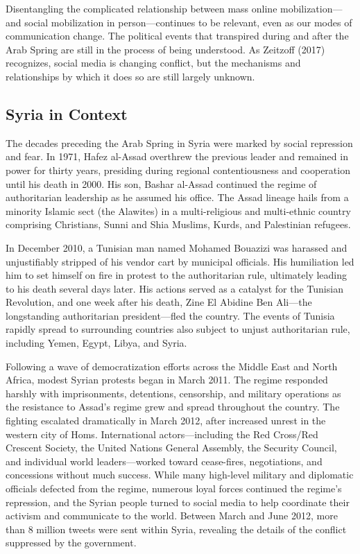 \documentclass[english,man]{apa6}
\begin{document}
Disentangling the complicated relationship between mass online
mobilization---and social mobilization in person---continues to be relevant,
even as our modes of communication change. The political events that
transpired during and after the Arab Spring are still in the process of being
understood. As Zeitzoff (2017) recognizes, social media is
changing conflict, but the mechanisms and relationships by which it does so are
still largely unknown.

\hypertarget{syria-in-context}{%
\subsection{Syria in Context}\label{syria-in-context}}

The decades preceding the Arab Spring in Syria were marked by
social repression and fear. In 1971, Hafez al-Assad overthrew the previous
leader and remained in power for thirty years, presiding during
regional contentiousness and cooperation until his death in 2000. His son,
Bashar al-Assad continued the regime of authoritarian leadership as he assumed
his office. The Assad lineage hails from a minority Islamic sect (the Alawites)
in a multi-religious and multi-ethnic country comprising Christians, Sunni and
Shia Muslims, Kurds, and Palestinian refugees.

In December 2010, a Tunisian man named Mohamed Bouazizi was harassed and
unjustifiably stripped of his vendor cart by municipal officials. His
humiliation led him to set himself on fire in protest to the authoritarian rule,
ultimately leading to his death several days later. His actions served as a
catalyst for the Tunisian Revolution, and one week after his death, Zine El
Abidine Ben Ali---the longstanding authoritarian president---fled the country.
The events of Tunisia rapidly spread to surrounding countries also subject to
unjust authoritarian rule, including Yemen, Egypt, Libya, and Syria.

Following a wave of democratization efforts across the Middle East and North
Africa, modest Syrian protests began in March 2011. The regime responded harshly
with imprisonments, detentions, censorship, and military operations as the
resistance to Assad's regime grew and spread throughout the country. The
fighting escalated dramatically in March 2012, after increased unrest in the
western city of Homs. International actors---including the Red Cross/Red
Crescent Society, the United Nations General Assembly, the Security Council, and
individual world leaders---worked toward cease-fires, negotiations, and
concessions without much success. While many high-level military and diplomatic
officials defected from the regime, numerous loyal forces continued the regime's
repression, and the Syrian people turned to social media to help coordinate
their activism and communicate to the world. Between March and June 2012, more
than 8 million tweets were sent within Syria, revealing the details of the
conflict suppressed by the government.
\end{document}
